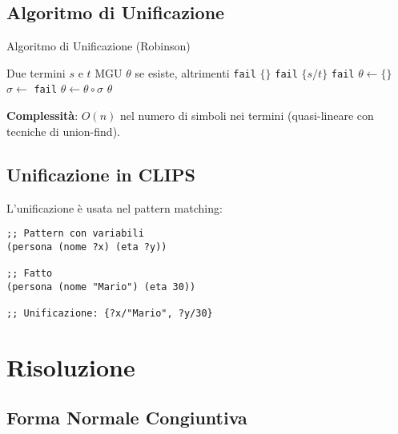 \subsection{Algoritmo di Unificazione}

\begin{algorithm}
\caption{Algoritmo di Unificazione (Robinson)}
\begin{algorithmic}[1]
\Require Due termini $s$ e $t$
\Ensure MGU $\theta$ se esiste, altrimenti \texttt{fail}
    \State \Return $\{\}$ 
      \State \Return \texttt{fail} 
    \Else
      \State \Return $\{s/t\}$
    \EndIf
    \State \Return {}
      \State \Return \texttt{fail}
    \EndIf
    \State $\theta \gets \{\}$
      \State $\sigma \gets$ 
        \State \Return \texttt{fail}
      \EndIf
      \State $\theta \gets \theta \circ \sigma$
    \EndFor
    \State \Return $\theta$
  \EndIf
\EndFunction
\end{algorithmic}
\end{algorithm}

\textbf{Complessità}: $O(n)$ nel numero di simboli nei termini (quasi-lineare con tecniche di union-find).

\subsection{Unificazione in CLIPS}

L'unificazione è usata nel pattern matching:
\begin{lstlisting}[language=CLIPS]
;; Pattern con variabili
(persona (nome ?x) (eta ?y))

;; Fatto
(persona (nome "Mario") (eta 30))

;; Unificazione: {?x/"Mario", ?y/30}
\end{lstlisting}

\section{Risoluzione}

\subsection{Forma Normale Congiuntiva}

